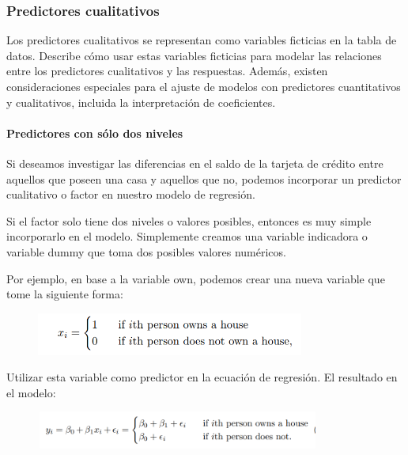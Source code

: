 \documentclass[
  letterpaper,
  DIV=11,
  numbers=noendperiod]{scrartcl}
\let\oldparagraph\paragraph
\renewcommand{\paragraph}[1]{\oldparagraph{#1}\mbox{}}
\begin{document}
\hypertarget{predictores-cualitativos}{%
\subsubsection{\texorpdfstring{\textbf{Predictores
cualitativos}}{Predictores cualitativos}}\label{predictores-cualitativos}}

Los predictores cualitativos se representan como variables ficticias en
la tabla de datos. Describe cómo usar estas variables ficticias para
modelar las relaciones entre los predictores cualitativos y las
respuestas. Además, existen consideraciones especiales para el ajuste de
modelos con predictores cuantitativos y cualitativos, incluida la
interpretación de coeficientes.

\hypertarget{predictores-con-suxf3lo-dos-niveles}{%
\paragraph{\texorpdfstring{\textbf{Predictores con sólo dos
niveles}}{Predictores con sólo dos niveles}}\label{predictores-con-suxf3lo-dos-niveles}}

Si deseamos investigar las diferencias en el saldo de la tarjeta de
crédito entre aquellos que poseen una casa y aquellos que no, podemos
incorporar un predictor cualitativo o factor en nuestro modelo de
regresión.

Si el factor solo tiene dos niveles o valores posibles, entonces es muy
simple incorporarlo en el modelo. Simplemente creamos una variable
indicadora o variable dummy que toma dos posibles valores numéricos.

Por ejemplo, en base a la variable own, podemos crear una nueva variable
que tome la siguiente forma:

\begin{figure}

{\centering \includegraphics[width=3.46875in,height=\textheight]{images/f19.png}

}

\end{figure}

Utilizar esta variable como predictor en la ecuación de regresión. El
resultado en el modelo:

\begin{figure}

{\centering \includegraphics[width=3.67708in,height=0.48958in]{images/f20.png}

}

\end{figure}
\end{document}
